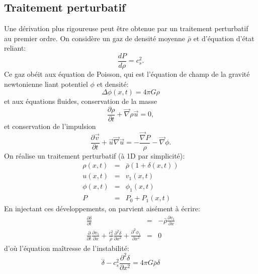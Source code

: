 \subsection{Traitement perturbatif}
Une dérivation plus rigoureuse peut être obtenue par un traitement perturbatif au premier ordre. On considère un gaz de densité moyenne $\bar \rho$ et d'équation d'état reliant:
\begin{equation}
\frac{dP}{d\rho}=c_s^2.
\end{equation}
Ce gaz obéit aux équation de Poisson, qui est l'équation de champ de la gravité newtonienne liant potentiel $\phi$ et densité:
\begin{equation}
\Delta \phi(x,t) = 4 \pi G \rho
\end{equation}
 et aux équations fluides, conservation de la masse
 \begin{equation}
 \frac{\partial \rho}{\partial t} + \vec \nabla \rho \vec u=0,
 \end{equation}
 et conservation de l'impulsion
 \begin{equation}
 \frac{\partial \vec v}{\partial t} +\vec u \vec \nabla \vec u = -\frac{\vec \nabla P}{\rho}-\vec \nabla \phi.
 \end{equation}
 On réalise un traitement perturbatif (à 1D par simplicité):
 \begin{eqnarray}
 \rho(x,t)&=&\bar \rho(1 +\delta(x,t))\\
 u(x,t)&=&v_1(x,t)\\
 \phi(x,t)&=&\phi_1(x,t)\\
 P&=&P_0+P_1(x,t)
 \end{eqnarray}
 En injectant ces développements, on parvient aisément à écrire:
 \begin{eqnarray}
 \frac{\partial \delta}{\partial t}&=&-\bar \rho \frac{\partial v_1}{\partial x}\\
 \frac{\partial}{\partial t}\frac{\partial v_1}{\partial x}+\frac{c_s^2}{\bar \rho}\frac{\partial^2 \delta}{\partial x^2}+\frac{\partial^2 \phi_1}{\partial x^2}&=&0
 \end{eqnarray}
 d'où l'équation maîtresse de l'instabilité:
 \begin{equation}
 \ddot \delta -c_s ^2\frac{\partial^2 \delta}{\partial x^2}=4\pi G \bar \rho \delta
 \end{equation}
